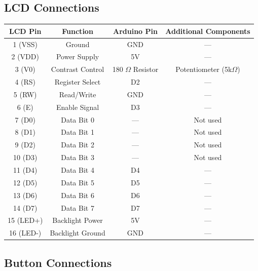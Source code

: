 \documentclass[journal]{IEEEtran}
\begin{document}
\subsection{LCD Connections}
\begin{center}
\begin{tabular}{|c|c|c|c|}
    \hline
    \textbf{LCD Pin} & \textbf{Function} & \textbf{Arduino Pin} & \textbf{Additional Components} \\
    \hline
    1 (VSS)  & Ground          & GND     & --- \\
    2 (VDD)  & Power Supply    & 5V      & --- \\
    3 (V0)   & Contrast Control &  180 $\Omega$ Resistor & Potentiometer (5k$\Omega$) \\
    4 (RS)   & Register Select  & D2      & --- \\
    5 (RW)   & Read/Write       & GND     & --- \\
    6 (E)    & Enable Signal    & D3      & --- \\
    7 (D0)   & Data Bit 0       & ---     & Not used \\
    8 (D1)   & Data Bit 1       & ---     & Not used \\
    9 (D2)   & Data Bit 2       & ---     & Not used \\
    10 (D3)  & Data Bit 3       & ---     & Not used \\
    11 (D4)  & Data Bit 4       & D4      & --- \\
    12 (D5)  & Data Bit 5       & D5      & --- \\
    13 (D6)  & Data Bit 6       & D6      & --- \\
    14 (D7)  & Data Bit 7       & D7      & --- \\
    15 (LED+) & Backlight Power  & 5V      & ---\\
    16 (LED-) & Backlight Ground & GND     & --- \\
    \hline
\end{tabular}
\end{center}

\subsection{Button Connections}
\end{document}
